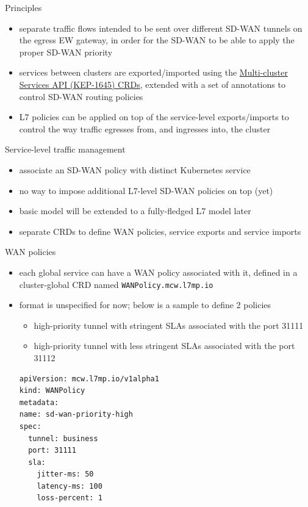 \documentclass[presentation]{beamer}
\begin{document}
\begin{frame}[label={sec:org1f54e76}]{Principles}
\begin{itemize}
\item \alert{\alert{separate traffic flows intended to be sent over different SD-WAN tunnels}} on the egress EW
gateway, in order for the SD-WAN to be able to apply the proper SD-WAN priority
\item services between clusters are exported/imported using the
\href{https://gateway-api.sigs.k8s.io}{\alert{\alert{Multi-cluster Services API (KEP-1645) CRDs}}}, extended
with a set of annotations to control SD-WAN routing policies
\item \alert{L7 policies can be applied on top of the service-level exports/imports} to control the way
traffic egresses from, and ingresses into, the cluster
\end{itemize}
\end{frame}

\begin{frame}[label={sec:org727b29f}]{Service-level traffic management}
\begin{itemize}
\item \alert{associate an SD-WAN policy with distinct Kubernetes service}
\item no way to impose additional L7-level SD-WAN policies on top (yet)
\item basic model will be extended to a fully-fledged L7 model later
\item separate CRDs to define WAN policies, service exports and service imports
\end{itemize}
\end{frame}

\begin{frame}[label={sec:orge5faad5},fragile]{WAN policies}
 \begin{itemize}
\item each global service can have a WAN policy associated with it, defined in a cluster-global CRD
named \texttt{WANPolicy.mcw.l7mp.io}
\item format is unspecified for now; below is a sample to define 2 policies
\begin{itemize}
\item \alert{high-priority tunnel} with stringent SLAs associated with the port 31111
\item \alert{high-priority tunnel} with less stringent SLAs associated with the port 31112
\end{itemize}
\lstset{language=yaml,label= ,caption= ,captionpos=b,numbers=none}
\begin{lstlisting}
apiVersion: mcw.l7mp.io/v1alpha1
kind: WANPolicy
metadata:
name: sd-wan-priority-high
spec:
  tunnel: business
  port: 31111
  sla:
    jitter-ms: 50
    latency-ms: 100
    loss-percent: 1
\end{lstlisting}
\end{itemize}
\end{frame}
\end{document}
